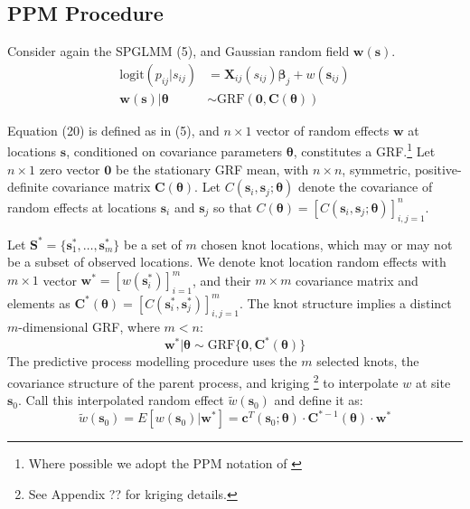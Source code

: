 \documentclass{article}
\begin{document}
\subsection{PPM Procedure}

Consider again the SPGLMM (5), and Gaussian random field $\pmb{w}(\pmb{s})$.
\begin{align}
\text{logit}(p_{ij}|s_{ij}) &= \pmb{X}_{ij}(s_{ij}) \pmb{\beta}_{j} + w(\pmb{s}_{ij}) \\
\pmb{w}(\pmb{s}) | \pmb{\theta} &\sim \text{GRF}(\pmb{0}, \pmb{C}(\pmb{\theta}))
\end{align}

Equation (20) is defined as in (5), and $n \times 1$ vector of random effects $\pmb{w}$ at locations $\pmb{s}$, conditioned on covariance parameters $\pmb{\theta}$, constitutes a GRF.\footnote{Where possible we adopt the PPM notation of \citep{Banerjee2008}}  Let $n \times 1$ zero vector $\pmb{0}$ be the stationary GRF mean, with $n \times n$, symmetric, positive-definite covariance matrix $\pmb{C}(\pmb{\theta})$. Let $C(\pmb{s}_{i}, \pmb{s}_{j}; \pmb{\theta})$ denote the covariance of random effects at locations $\pmb{s}_{i}$ and $\pmb{s}_{j}$ so that $C(\pmb{\theta}) = [C(\pmb{s}_{i}, \pmb{s}_{j}; \pmb{\theta})]_{i,j=1}^{n}$.

Let $\pmb{S}^{*} = \{\pmb{s}_{1}^{*}, \dots, \pmb{s}_{m}^{*}\}$ be a set of $m$ chosen knot locations, which may or may not be a subset of observed locations. We denote knot location random effects with $m \times 1$ vector $\pmb{w}^{*} = \left[w(\pmb{s}_{i}^{*})\right]_{i=1}^{m}$, and their $m \times m$ covariance matrix and elements as $\pmb{C}^{*}(\pmb{\theta}) = \left[C(\pmb{s}_{i}^{*}, \pmb{s}_{j}^{*})\right]_{i,j = 1}^{m}$. The knot structure implies a distinct $m$-dimensional GRF, where $m < n$:
\begin{equation}
\pmb{w}^{*}|\pmb{\theta} \sim \text{GRF}\{\pmb{0}, \pmb{C}^{*}(\pmb{\theta})\}
\end{equation}
The predictive process modelling procedure uses the $m$ selected knots, the covariance structure of the parent process, and kriging \footnote{See Appendix ?? for kriging details.} to interpolate $w$ at site $\pmb{s}_{0}$. Call this interpolated random effect $\tilde{w}(\pmb{s}_{0})$ and define it as:
\begin{equation}
\tilde{w}(\pmb{s}_{0}) = E[w(\pmb{s}_{0})|\pmb{w}^{*}]= \pmb{c}^{T}(\pmb{s}_{0};\pmb{\theta}) \cdot \pmb{C}^{*-1}(\pmb{\theta}) \cdot \pmb{w}^{*}
\end{equation}
\end{document}

